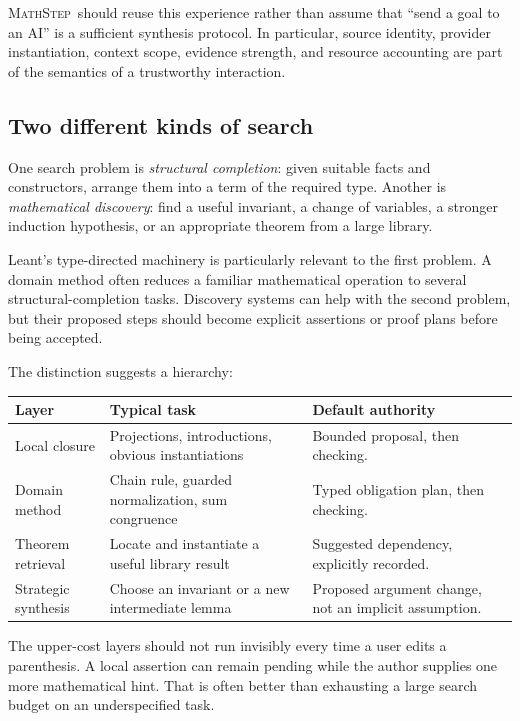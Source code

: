\documentclass[11pt,a4paper]{article}
\theoremstyle{remark}
\newcommand{\ms}{\textsc{MathStep}}
\begin{document}
\ms\ should reuse this experience rather than assume that ``send a goal to an AI'' is a sufficient synthesis protocol. In particular, source identity, provider instantiation, context scope, evidence strength, and resource accounting are part of the semantics of a trustworthy interaction.

\subsection{Two different kinds of search}
One search problem is \emph{structural completion}: given suitable facts and constructors, arrange them into a term of the required type. Another is \emph{mathematical discovery}: find a useful invariant, a change of variables, a stronger induction hypothesis, or an appropriate theorem from a large library.

Leant's type-directed machinery is particularly relevant to the first problem. A domain method often reduces a familiar mathematical operation to several structural-completion tasks. Discovery systems can help with the second problem, but their proposed steps should become explicit assertions or proof plans before being accepted.

The distinction suggests a hierarchy:
\begin{center}
\begin{tabularx}{.98\linewidth}{@{}L{.22\linewidth}YY@{}}
\toprule
Layer & Typical task & Default authority\\
\midrule
Local closure & Projections, introductions, obvious instantiations & Bounded proposal, then checking.\\[3pt]
Domain method & Chain rule, guarded normalization, sum congruence & Typed obligation plan, then checking.\\[3pt]
Theorem retrieval & Locate and instantiate a useful library result & Suggested dependency, explicitly recorded.\\[3pt]
Strategic synthesis & Choose an invariant or a new intermediate lemma & Proposed argument change, not an implicit assumption.\\
\bottomrule
\end{tabularx}
\end{center}
The upper-cost layers should not run invisibly every time a user edits a parenthesis. A local assertion can remain pending while the author supplies one more mathematical hint. That is often better than exhausting a large search budget on an underspecified task.
\end{document}
